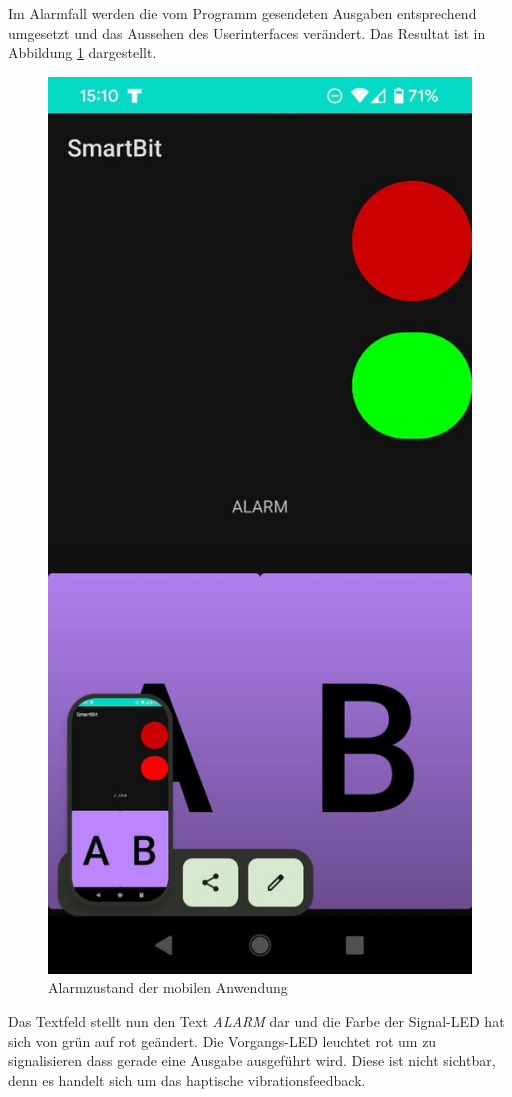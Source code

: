 \documentclass[11pt,a4paper]{report}
\begin{document}
Im Alarmfall werden die vom Programm gesendeten Ausgaben entsprechend umgesetzt und das Aussehen des Userinterfaces verändert.
Das Resultat ist in Abbildung \ref{fig:app_alarm} dargestellt.
\begin{figure}[htbp]
  \centering
  \includegraphics[height=0.4\textheight]{images/app_alarm}
  \caption{Alarmzustand der mobilen Anwendung}
  \label{fig:app_alarm}
\end{figure}
Das Textfeld stellt nun den Text \textit{ALARM} dar und die Farbe der Signal-LED hat sich von grün auf rot geändert.
Die Vorgangs-LED leuchtet rot um zu signalisieren dass gerade eine Ausgabe ausgeführt wird.
Diese ist nicht sichtbar, denn es handelt sich um das haptische vibrationsfeedback.
\end{document}

